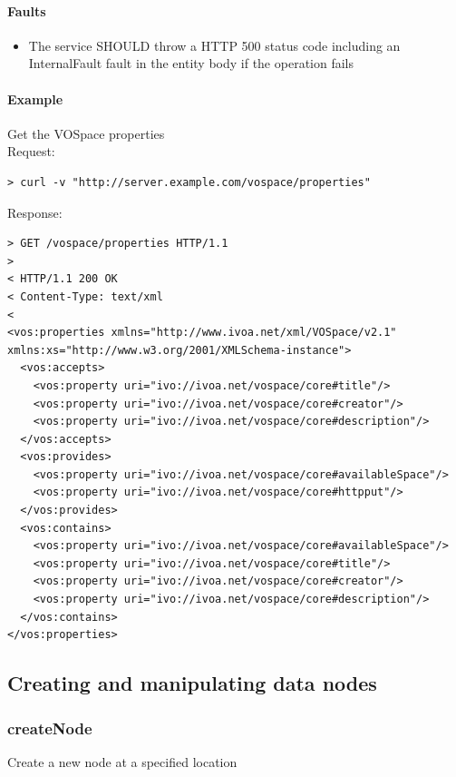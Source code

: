 \documentclass[11pt,a4paper]{ivoa}
\begin{document}
\paragraph{Faults}
\begin{itemize}
    \item The service SHOULD throw a HTTP 500 status code including an InternalFault fault in the entity body if the operation fails
\end{itemize}

\paragraph{Example}
Get the VOSpace properties
\\[5px]
\noindent
Request:
\begin{lstlisting}
> curl -v "http://server.example.com/vospace/properties"
\end{lstlisting}
Response:
\begin{lstlisting}
> GET /vospace/properties HTTP/1.1
>
< HTTP/1.1 200 OK
< Content-Type: text/xml
<
<vos:properties xmlns="http://www.ivoa.net/xml/VOSpace/v2.1" xmlns:xs="http://www.w3.org/2001/XMLSchema-instance">
  <vos:accepts>
    <vos:property uri="ivo://ivoa.net/vospace/core#title"/>
    <vos:property uri="ivo://ivoa.net/vospace/core#creator"/>
    <vos:property uri="ivo://ivoa.net/vospace/core#description"/>
  </vos:accepts>
  <vos:provides>
    <vos:property uri="ivo://ivoa.net/vospace/core#availableSpace"/>
    <vos:property uri="ivo://ivoa.net/vospace/core#httpput"/>
  </vos:provides>
  <vos:contains>
    <vos:property uri="ivo://ivoa.net/vospace/core#availableSpace"/>
    <vos:property uri="ivo://ivoa.net/vospace/core#title"/>
    <vos:property uri="ivo://ivoa.net/vospace/core#creator"/>
    <vos:property uri="ivo://ivoa.net/vospace/core#description"/>
  </vos:contains>
</vos:properties>
\end{lstlisting}

\subsection{Creating and manipulating data nodes}
\label{subsec:creating and manipulating data nodes}

\subsubsection{createNode}
\label{subsubsec:createnode}
Create a new node at a specified location
\end{document}
